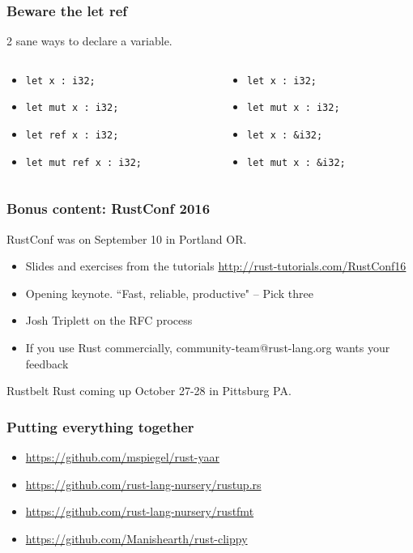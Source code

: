 \documentclass{beamer}
\begin{document}
\begin{frame}[fragile]
\frametitle{Beware the let ref}
2 sane ways to declare a variable.
\begin{columns}
\begin{column}{0.5\textwidth}
\begin{itemize}
\item \verb#let x : i32;#
\item \verb#let mut x : i32;#
\item {\color{red} \verb#let ref x : i32;#}
\item {\color{red} \verb#let mut ref x : i32;#}
\end{itemize}
\end{column}
\begin{column}{0.5\textwidth}
\begin{itemize}
\item \verb#let x : i32;#
\item \verb#let mut x : i32;#
\item \verb#let x : &i32;#
\item \verb#let mut x : &i32;#
\end{itemize}
\end{column}
\end{columns}
\end{frame}

\begin{frame}
\frametitle{Bonus content: RustConf 2016}
RustConf was on September 10 in Portland OR.
\begin{itemize}
\item Slides and exercises from the tutorials \url{http://rust-tutorials.com/RustConf16}
\item Opening keynote. ``Fast, reliable, productive" -- Pick three
\item Josh Triplett on the RFC process
\item If you use Rust commercially, community-team@rust-lang.org wants your feedback
\end{itemize}
Rustbelt Rust coming up October 27-28 in Pittsburg PA.
\end{frame}

\begin{frame}
\frametitle{Putting everything together}
\begin{itemize}
\item \url{https://github.com/mspiegel/rust-yaar}
\item \url{https://github.com/rust-lang-nursery/rustup.rs}
\item \url{https://github.com/rust-lang-nursery/rustfmt}
\item \url{https://github.com/Manishearth/rust-clippy}
\end{itemize}
\end{frame}
\end{document}
